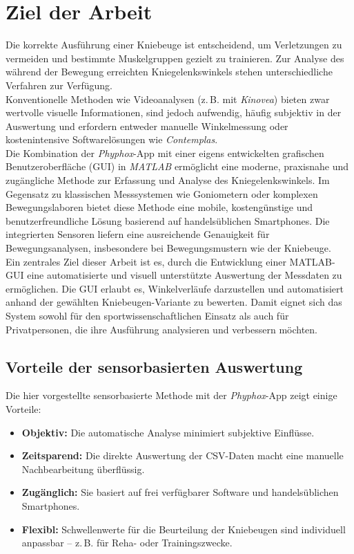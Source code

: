 \section{Ziel der Arbeit}
\noindent Die korrekte Ausführung einer Kniebeuge ist entscheidend, um Verletzungen zu vermeiden und bestimmte Muskelgruppen gezielt zu trainieren. Zur Analyse des während der Bewegung erreichten Kniegelenkswinkels stehen unterschiedliche Verfahren zur Verfügung.
\\
\noindent Konventionelle Methoden wie Videoanalysen (z.\,B. mit \textit{Kinovea}) bieten zwar wertvolle visuelle Informationen, sind jedoch aufwendig, häufig subjektiv in der Auswertung und erfordern entweder manuelle Winkelmessung oder kostenintensive Softwarelösungen wie \textit{Contemplas}.
\\
\noindent Die Kombination der \textit{Phyphox}-App mit einer eigens entwickelten grafischen Benutzeroberfläche (GUI) in \textit{MATLAB} ermöglicht eine moderne, praxisnahe und zugängliche Methode zur Erfassung und Analyse des Kniegelenkswinkels. Im Gegensatz zu klassischen Messsystemen wie Goniometern oder komplexen Bewegungslaboren bietet diese Methode eine mobile, kostengünstige und benutzerfreundliche Lösung basierend auf handelsüblichen Smartphones. Die integrierten Sensoren liefern eine ausreichende Genauigkeit für Bewegungsanalysen, insbesondere bei Bewegungsmustern wie der Kniebeuge.
\\
\noindent Ein zentrales Ziel dieser Arbeit ist es, durch die Entwicklung einer MATLAB-GUI eine automatisierte und visuell unterstützte Auswertung der Messdaten zu ermöglichen. Die GUI erlaubt es, Winkelverläufe darzustellen und automatisiert anhand der gewählten Kniebeugen-Variante zu bewerten. Damit eignet sich das System sowohl für den sportwissenschaftlichen Einsatz als auch für Privatpersonen, die ihre Ausführung analysieren und verbessern möchten.

\subsection{Vorteile der sensorbasierten Auswertung}
\noindent Die hier vorgestellte sensorbasierte Methode mit der \textit{Phyphox}-App zeigt einige Vorteile:
\begin{itemize}
  \item \textbf{Objektiv:} Die automatische Analyse minimiert subjektive Einflüsse.
  \item \textbf{Zeitsparend:} Die direkte Auswertung der CSV-Daten macht eine manuelle Nachbearbeitung überflüssig.
  \item \textbf{Zugänglich:} Sie basiert auf frei verfügbarer Software und handelsüblichen Smartphones.
  \item \textbf{Flexibl:} Schwellenwerte für die Beurteilung der Kniebeugen sind individuell anpassbar – z.\,B. für Reha- oder Trainingszwecke.
\end{itemize}

